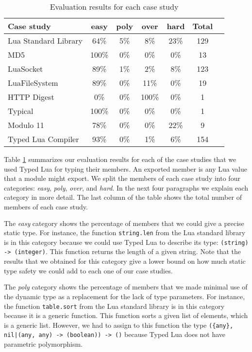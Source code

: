 \begin{table}[!ht]
\begin{center}
\begin{tabular}{|l|c|c|c|c|c|c|}
\hline
\textbf{Case study} & \textbf{easy} & \textbf{poly} & \textbf{over} & \textbf{hard} & \textbf{Total} \\
\hline
Lua Standard Library & 64\% & 5\% & 8\% & 23\% & 129 \\ %
\hline
MD5 & 100\% & 0\% & 0\% & 0\% & 13 \\ %
\hline
LuaSocket & 89\% & 1\% & 2\% & 8\% & 123 \\ %
\hline
LuaFileSystem & 89\% & 0\% & 11\% & 0\% & 19 \\ %
\hline
HTTP Digest & 0\% & 0\% & 100\% & 0\% & 1 \\ %
\hline
Typical & 100\% & 0\% & 0\% & 0\% & 1 \\ %
\hline
Modulo 11 & 78\% & 0\% & 0\% & 22\% & 9 \\ %
\hline
Typed Lua Compiler & 93\% & 0\% & 1\% & 6\% & 154 \\ %
\hline
\end{tabular}
\end{center}
\caption{Evaluation results for each case study}
\label{tab:evalbycase}
\end{table}

Table \ref{tab:evalbycase} summarizes our evaluation results for each
of the case studies that we used Typed Lua for typing their members.
An exported member is any Lua value that a module might export.
We split the members of each case study into four categories:
\emph{easy}, \emph{poly}, \emph{over}, and \emph{hard}.
In the next four paragraphs we explain each category in more detail.
The last column of the table shows the total number of members
of each case study.

The \emph{easy} category shows the percentage of members that
we could give a precise static type.
For instance, the function \texttt{string.len} from the Lua
standard library is in this category because we could use
Typed Lua to describe its type: \texttt{(string) -> (integer)}.
This function returns the length of a given string.
Note that the results that we obtained for this category give
a lower bound on how much static type safety
we could add to each one of our case studies.

The \emph{poly} category shows the percentage of members that
we made minimal use of the dynamic type as a replacement for the
lack of type parameters.
For instance, the function \texttt{table.sort} from the Lua
standard library is in this category because it is a generic function.
This function sorts a given list of elements, which is a generic list.
However, we had to assign to this function the type
\texttt{(\{any\}, nil|(any, any) -> (boolean)) -> ()} because
Typed Lua does not have parametric polymorphism.

